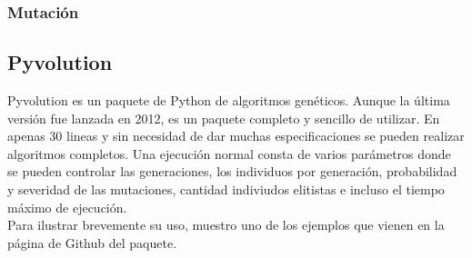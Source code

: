 \documentclass[12pt,a4paper]{article}
\begin{document}
			\subsubsection{Mutaci\'on}

		\subsection{Pyvolution}
		
		Pyvolution es un paquete de Python de algoritmos gen\'eticos. Aunque la \'ultima versi\'on fue lanzada en 2012, es un paquete completo y sencillo de utilizar. En apenas 30 lineas y sin necesidad de dar muchas especificaciones se pueden realizar algoritmos completos. Una ejecuci\'on normal consta de varios par\'ametros donde se pueden controlar las generaciones, los individuos por generaci\'on, probabilidad y severidad de las mutaciones, cantidad indiviudos elitistas e incluso el tiempo m\'aximo de ejecuci\'on.\\
		
		Para ilustrar brevemente su uso, muestro uno de los ejemplos que vienen en la p\'agina de Github del paquete.
		
\end{document}
